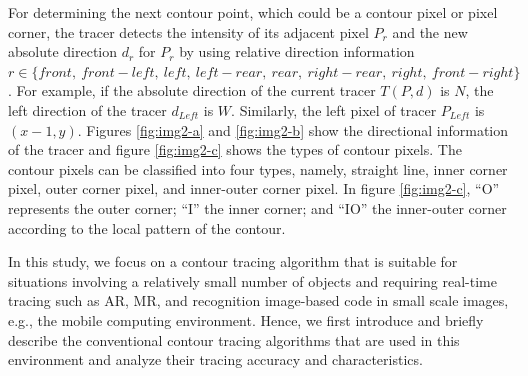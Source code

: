 For determining the next contour point, which could be a contour pixel or pixel corner, the tracer detects the intensity of its adjacent pixel $P_r$ and the new absolute direction $d_r$ for $P_r$ by using relative direction information $r\in\{front,\ front-left,\ left,\ left-rear,\ rear,\ right-rear,\ right,\ front-right\}$. For example, if the absolute direction of the current tracer $T(P, d)$ is $N$, the left direction of the tracer $d_{Left}$ is $W$. Similarly, the left pixel of tracer $P_{Left}$ is $(x-1, y)$. Figures \ref{fig:img2-a} and \ref{fig:img2-b} show the directional information of the tracer and figure \ref{fig:img2-c} shows the types of contour pixels. The contour pixels can be classified into four types, namely, straight line, inner corner pixel, outer corner pixel, and inner-outer corner pixel. In figure \ref{fig:img2-c}, ``O'' represents the outer corner; ``I'' the inner corner; and ``IO'' the inner-outer corner according to the local pattern of the contour.

In this study, we focus on a contour tracing algorithm that is suitable for situations involving a relatively small number of objects and requiring real-time tracing such as AR, MR, and recognition image-based code in small scale images, e.g., the mobile computing environment. Hence, we first introduce and briefly describe the conventional contour tracing algorithms that are used in this environment and analyze their tracing accuracy and characteristics.  

